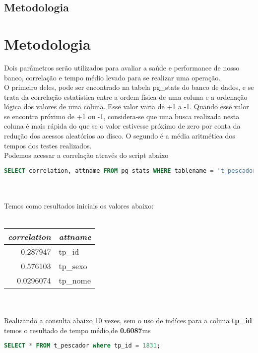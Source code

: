 \documentclass[12pt, a4paper, twoside, titlepage]{article}
\begin{document}
\subsection{Metodologia}

\section{Metodologia} \label{documentclasses}
Dois parâmetros serão utilizados para avaliar a saúde e performance de nosso banco, correlação e tempo médio levado para se realizar uma operação.
\\O primeiro deles, pode ser encontrado na tabela pg\_stats do banco de dados, e se trata da correlação estatística entre a ordem física de uma coluna e a ordenação lógica dos valores de uma coluna. Esse valor varia de +1 a -1. Quando esse valor se encontra próximo de +1 ou -1, considera-se que uma busca realizada nesta coluna é mais rápida do que se o valor estivesse próximo de zero por conta da redução dos acessos aleatórios ao disco. O segundo é a média aritmética dos tempos dos testes realizados.
\\Podemos acessar a correlação através do script abaixo
\begin{lstlisting}[language=SQL]
SELECT correlation, attname FROM pg_stats WHERE tablename = 't_pescador';
\end{lstlisting}
\\\\Temos como resultados iniciais os valores abaixo:\\\\
\begin{tabular}{r | l}
	\textit{correlation} & \textit{attname} \\
	\hline
	0.287947 & tp\_id \\
	0.576103 & tp\_sexo \\
	0.0296074 & tp\_nome \\
\end{tabular}
\\\\Realizando a consulta abaixo 10 vezes, sem o uso de indíces para a coluna \textbf{tp\_id} temos o resultado de tempo médio,de \textbf{0.6087}ms
\begin{lstlisting}[language=SQL]
SELECT * FROM t_pescador where tp_id = 1831;
\end{lstlisting}
\end{document}

